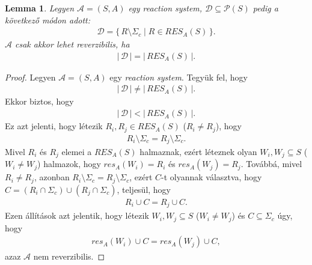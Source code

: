 \documentclass[12pt]{article}
\theoremstyle{definition}
\theoremstyle{remark}
\theoremstyle{plain}
\theoremstyle{plain}
\newtheorem*{lemma*}{Lemma}
\newcommand{\res}{\textit{res}}
\begin{document}
    \begin{lemma*}
        Legyen $\mathscr{A} = (S, A)$ egy \textit{reaction system}, $\mathcal{D} \subseteq \mathcal{P}(S)$ pedig a következő módon adott:
        \begin{align*}
            \mathcal{D} = \{ \, R \setminus \Sigma_{c} \mid R \in \textit{RES}_{A}(S) \, \}.
        \end{align*}
        $\mathscr{A}$ csak akkor lehet reverzibilis, ha
        \begin{align*}
            |\,\mathcal{D}\,| = |\,\textit{RES}_{A}(S)\,|.
        \end{align*}
    \end{lemma*}

    \begin{proof}
        Legyen $\mathscr{A} = (S, A)$ egy \textit{reaction system}. Tegyük fel, hogy 
        \begin{align*}
            |\,\mathcal{D}\,| \neq |\,\textit{RES}_{A}(S)\,|.
        \end{align*}
        Ekkor biztos, hogy
        \begin{align*}
            |\,\mathcal{D}\,| < |\,\textit{RES}_{A}(S)\,|.
        \end{align*}
        Ez azt jelenti, hogy létezik $R_{i}, R_{j} \in \textit{RES}_{A}(S)$ ($R_{i} \neq R_{j}$), hogy
        \begin{align*}
            R_{i} \setminus \Sigma_{c} = R_{j} \setminus \Sigma_{c}.
        \end{align*}
        Mivel $R_{i}$ és $R_{j}$ elemei a $\textit{RES}_{A}(S)$ halmaznak, ezért léteznek olyan $W_{i}, W_{j} \subseteq S$ ($W_{i} \neq W_{j}$) halmazok, hogy $\res_{A}(W_{i}) = R_{i}$ és $\res_{A}(W_{j}) = R_{j}$. Továbbá, mivel $R_{i} \neq R_{j}$, azonban $R_{i} \setminus \Sigma_{c} = R_{j} \setminus \Sigma_{c}$, ezért $C$-t olyannak választva, hogy $C = (R_{i} \cap \Sigma_{c}) \cup (R_{j} \cap \Sigma_{c})$, teljesül, hogy
        \begin{align*}
            R_{i} \cup C = R_{j} \cup C.
        \end{align*}
        Ezen állítások azt jelentik, hogy létezik $W_{i}, W_{j} \subseteq S$ ($W_{i} \neq W_{j}$) és $C \subseteq \Sigma_{c}$ úgy, hogy
        \begin{align*}
            \res_{A}(W_{i}) \cup C = \res_{A}(W_{j}) \cup C,
        \end{align*}
        azaz $\mathscr{A}$ nem reverzibilis.
    \end{proof}     
\end{document}
